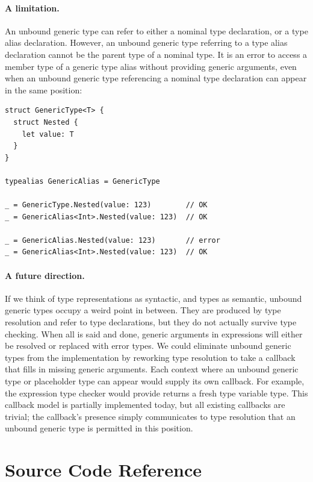 \documentclass[../generics]{subfiles}
\begin{document}
\paragraph{A limitation.} An unbound generic type can refer to either a nominal type declaration, or a type alias declaration. However, an unbound generic type referring to a type alias declaration cannot be the parent type of a nominal type. It is an error to access a member type of a generic type alias without providing generic arguments, even when an unbound generic type referencing a nominal type declaration can appear in the same position:
\begin{Verbatim}
struct GenericType<T> {
  struct Nested {
    let value: T
  }
}

typealias GenericAlias = GenericType

_ = GenericType.Nested(value: 123)        // OK
_ = GenericAlias<Int>.Nested(value: 123)  // OK

_ = GenericAlias.Nested(value: 123)       // error
_ = GenericAlias<Int>.Nested(value: 123)  // OK
\end{Verbatim}

\paragraph{A future direction.} If we think of type representations as syntactic, and types as semantic, unbound generic types occupy a weird point in between. They are produced by type resolution and refer to type declarations, but they do not actually survive type checking. When all is said and done, generic arguments in expressions will either be resolved or replaced with error types. We could eliminate unbound generic types from the implementation by reworking type resolution to take a callback that fills in missing generic arguments. Each context where an unbound generic type or placeholder type can appear would supply its own callback. For example, the expression type checker would provide returns a fresh type variable type. This callback model is partially implemented today, but all existing callbacks are trivial; the callback's presence simply communicates to type resolution that an unbound generic type is permitted in this position.

\section{Source Code Reference}\label{src:type resolution}
\end{document}
